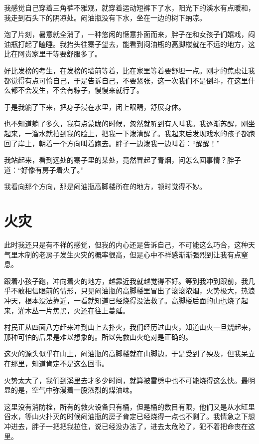 我感觉自己穿着三角裤不雅观，就穿着运动短裤下了水，阳光下的溪水有点暖和，我走到石头下的阴凉处。闷油瓶没有下水，坐在一边的树下纳凉。

泡了片刻，暑意就全消了，一种悠闲的惬意扑面而来，胖子在和女孩子们嬉戏，闷油瓶打起了瞌睡。我抬头往寨子望去，能看到闷油瓶的高脚楼就在不远的地方，这比在阿贵家里干等要舒服多了。

好比发榜的考生，在发榜的墙前等着，比在家里等着要舒坦一点。刚才的焦虑让我都觉得有点可怜自己，于是告诉自己，不要紧张，这一次我们不是倒斗，在这里什么都不会发生，不会有粽子，慢慢来就行了。

于是我躺了下来，把身子浸在水里，闭上眼睛，舒展身体。

也不知道躺了多久，我有点蒙眬的时候，忽然就听到有人叫我。我逐渐苏醒，刚坐起来，一溜水就拍到我的脸上，把我一下泼清醒了。我起来后发现戏水的孩子都跑回了岸上，朝着一个方向叫着跑去。胖子一边泼我一边叫着：“醒醒！”

我站起来，看到远处的寨子里的某处，竟然冒起了青烟，问怎么回事情？胖子道：“好像有房子着火了。”

我看向那个方向，那是闷油瓶高脚楼所在的地方，顿时觉得不妙。

\chapter{火灾}

此时我还只是有不祥的感觉，但我的内心还是告诉自己，不可能这么巧合，这种天气里木制的老房子发生火灾的概率很高，但是心中不祥感渐渐强烈到让我有点窒息。

跟着小孩子跑，冲向着火的地方，越靠近我就越觉得不好。等到我冲到跟前，我几乎不敢相信眼前的情形，只见闷油瓶的高脚楼里冒出了滚滚浓烟，火势极大，热浪冲天，根本没法靠近，一看就知道已经烧得没法救了。高脚楼后面的山也烧了起来，灌木丛一片焦黑，火还在往上蔓延。

村民正从四面八方赶来冲到山上去扑火，我们经历过山火，知道山火一旦烧起来，那种可怕的后果是难以想象的。所以先救山火绝对是正确的。

这火的源头似乎在山上，闷油瓶的高脚楼就在山脚边，于是受到了殃及，但我呆立在那里，知道肯定不是这么回事。

火势太大了，我们到溪里去才多少时间，就算被雷劈中也不可能烧得这么快。最明显的是，空气中弥漫着一股浓烈的煤油味。

这里没有消防栓，所有的救火设备只有桶，但是桶的数目有限，他们又是从水缸里舀水，等山火扑灭的时候闷油瓶的房子肯定已经烧得一点也不剩了。我情急之下想冲进去，胖子一把把我拉住，说已经没办法了，进去太危险了，犯不着把命丧在这里。

